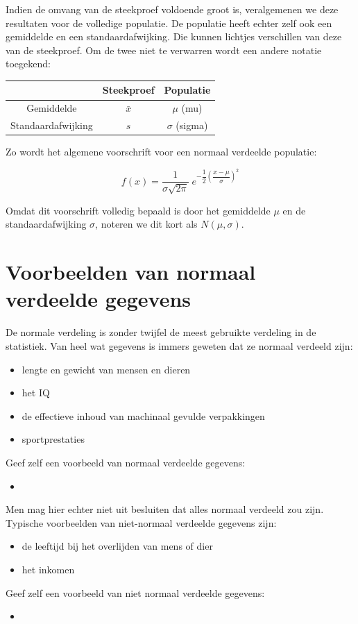 \documentclass[12pt,twoside,a4paper]{article}
\begin{document}
Indien de omvang van de steekproef voldoende groot is, veralgemenen we deze resultaten voor de volledige populatie. De populatie heeft echter zelf ook een gemiddelde en een standaardafwijking. Die kunnen lichtjes verschillen van deze van de steekproef. Om de twee niet te verwarren wordt een andere notatie toegekend:

\begin{center}
\begin{tabular}{c|c|c}
                   & Steekproef & Populatie   \\
\hline
Gemiddelde         & $\bar{x}$  & $\mu$ (mu)    \\
Standaardafwijking & $s$        & $\sigma$ (sigma) \\
\end{tabular}
\end{center}

Zo wordt het algemene voorschrift voor een normaal verdeelde populatie:

$$f(x)=\dfrac{1}{\sigma{\sqrt{2\pi}}}\;e^{-\dfrac{1}{2}\left(\dfrac{x-\mu}{\sigma}\right)^2}$$

Omdat dit voorschrift volledig bepaald is door het gemiddelde $\mu$ en de standaardafwijking $\sigma$, noteren we dit kort als $N(\mu,\sigma)$.

\cleardoublepage
\section{Voorbeelden van normaal verdeelde gegevens}

De normale verdeling is zonder twijfel de meest gebruikte verdeling in de statistiek. Van heel wat gegevens is immers geweten dat ze normaal verdeeld zijn:
\begin{itemize}
  \item lengte en gewicht van mensen en dieren
  \item het IQ
  \item de effectieve inhoud van machinaal gevulde verpakkingen
  \item sportprestaties
\end{itemize}
\begin{oefening} Geef zelf een voorbeeld van normaal verdeelde gegevens:
\begin{itemize}
  \item \dotfill
\end{itemize}
\end{oefening}

Men mag hier echter niet uit besluiten dat alles normaal verdeeld zou zijn. Typische voorbeelden van niet-normaal verdeelde gegevens zijn:
\begin{itemize}
  \item de leeftijd bij het overlijden van mens of dier
  \item het inkomen
\end{itemize}
\begin{oefening} Geef zelf een voorbeeld van niet normaal verdeelde gegevens:
\begin{itemize}
  \item \dotfill
\end{itemize}
\end{oefening}
\end{document}
